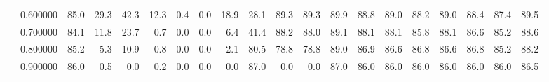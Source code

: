 \begin{tabular}{llrrrrrrrrrrrrrrrrrr}
 & 0.600000 & 85.0 & 29.3 & 42.3 & 12.3 & 0.4 & 0.0 & 18.9 & 28.1 & 89.3 & 89.3 & 89.9 & 88.8 & 89.0 & 88.2 & 89.0 & 88.4 & 87.4 & 89.5 \\
 & 0.700000 & 84.1 & 11.8 & 23.7 & 0.7 & 0.0 & 0.0 & 6.4 & 41.4 & 88.2 & 88.0 & 89.1 & 88.1 & 88.1 & 85.8 & 88.1 & 86.6 & 85.2 & 88.6 \\
 & 0.800000 & 85.2 & 5.3 & 10.9 & 0.8 & 0.0 & 0.0 & 2.1 & 80.5 & 78.8 & 78.8 & 89.0 & 86.9 & 86.6 & 86.8 & 86.6 & 86.8 & 85.2 & 88.2 \\
 & 0.900000 & 86.0 & 0.5 & 0.0 & 0.2 & 0.0 & 0.0 & 0.0 & 87.0 & 0.0 & 0.0 & 87.0 & 86.0 & 86.0 & 86.0 & 86.0 & 86.0 & 86.0 & 86.5 \\
\cline{1-20}
\bottomrule
\end{tabular}
